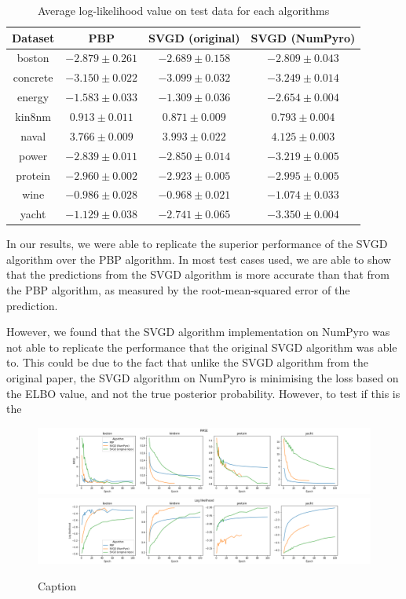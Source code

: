 \begin{table}[]
\centering
\caption{Average log-likelihood value on test data for each algorithms} 
\label{tab:bnn_logl}
\begin{tabular}{|c|ccc|}
\hline
 Dataset & PBP & SVGD (original) & SVGD (NumPyro)  \\
 \hline
boston & $-2.879 \pm 0.261$ & $-2.689 \pm 0.158$ & $-2.809 \pm 0.043$ \\
concrete & $-3.150 \pm 0.022$ & $-3.099 \pm 0.032$ & $-3.249 \pm 0.014$ \\
energy & $-1.583 \pm 0.033$ & $-1.309 \pm 0.036$ & $-2.654 \pm 0.004$ \\
kin8nm & $0.913 \pm 0.011$ & $0.871 \pm 0.009$ & $0.793 \pm 0.004$ \\
naval & $3.766 \pm 0.009$ & $3.993 \pm 0.022$ & $4.125 \pm 0.003$ \\
power & $-2.839 \pm 0.011$ & $-2.850 \pm 0.014$ & $-3.219 \pm 0.005$ \\
protein & $-2.960 \pm 0.002$ & $-2.923 \pm 0.005$ & $-2.995 \pm 0.005$ \\
wine & $-0.986 \pm 0.028$ & $-0.968 \pm 0.021$ & $-1.074 \pm 0.033$ \\
yacht & $-1.129 \pm 0.038$ & $-2.741 \pm 0.065$ & $-3.350 \pm 0.004$ \\
\hline
\end{tabular}
\end{table}

In our results, we were able to replicate the superior performance of the SVGD algorithm over the PBP algorithm. In most test cases used, we are able to show that the predictions from the SVGD algorithm is more accurate than that from the PBP algorithm, as measured by the root-mean-squared error of the prediction. 

However, we found that the SVGD algorithm implementation on NumPyro was not able to replicate the performance that the original SVGD algorithm was able to. This could be due to the fact that unlike the SVGD algorithm from the original paper, the SVGD algorithm on NumPyro is minimising the loss based on the ELBO value, and not the true posterior probability. However, to test if this is the 

\begin{figure}[h]
    \centering
    \includegraphics[width=\textwidth]{figs/bayesian_epoch_RMSE.png}
    \includegraphics[width=\textwidth]{figs/bayesian_epoch_Loglikelihood.png}
    \caption{Caption}
    \label{fig:my_label}
\end{figure}